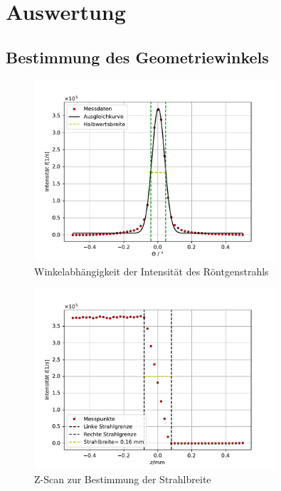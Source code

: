 \section{Auswertung}
\label{sec:Auswertung}
\subsection{Bestimmung des Geometriewinkels}
\begin{figure}[H]
    \centering
    \includegraphics[width=0.8\textwidth]{plots/Detectorscan.pdf}
    \caption{Winkelabhängigkeit der Intensität des Röntgenstrahls}
    \label{fig:Detectorscan}
\end{figure}

\begin{figure}[H]
    \centering
    \includegraphics[width=0.8\textwidth]{plots/Zscan.pdf}
    \caption{Z-Scan zur Bestimmung der Strahlbreite}
    \label{fig:Zscan}
\end{figure}

